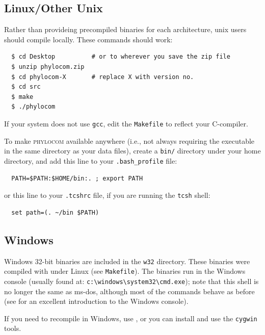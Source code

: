 \documentclass[12pt,letterpaper]{article}
\begin{document}
\subsection{Linux/Other Unix}

Rather than provideing precompiled binaries for each architecture,
unix users should compile locally.  These commands should work:
\begin{verbatim}
  $ cd Desktop          # or to wherever you save the zip file
  $ unzip phylocom.zip
  $ cd phylocom-X       # replace X with version no.
  $ cd src
  $ make
  $ ./phylocom
\end{verbatim}
If your system does not use \verb|gcc|, edit the \verb|Makefile| to
reflect your C-compiler.


To make {\scshape phylocom} available anywhere (i.e., not always
requiring the executable in the same directory as your data files),
create a \verb|bin/| directory under your home directory, and add this
line to your \verb|.bash_profile| file:
\begin{verbatim}
  PATH=$PATH:$HOME/bin:. ; export PATH
\end{verbatim}
or this line to your \verb|.tcshrc| file, if you are running the
\verb|tcsh| shell:
\begin{verbatim}
  set path=(. ~/bin $PATH)
\end{verbatim}

\subsection{Windows}

Windows 32-bit binaries are included in the \texttt{w32}
directory. These binaries were compiled with
 under
Linux (see \verb|Makefile|).  The binaries run in the Windows console
(usually found at: \verb|c:\windows\system32\cmd.exe|); note that this
shell is no longer the same as {\sc ms-dos}, although most of the
commands behave as before (see
for an excellent introduction to the Windows console).

If you need to recompile in Windows, use
, or you
can install and use the \verb|cygwin| tools.
\end{document}
